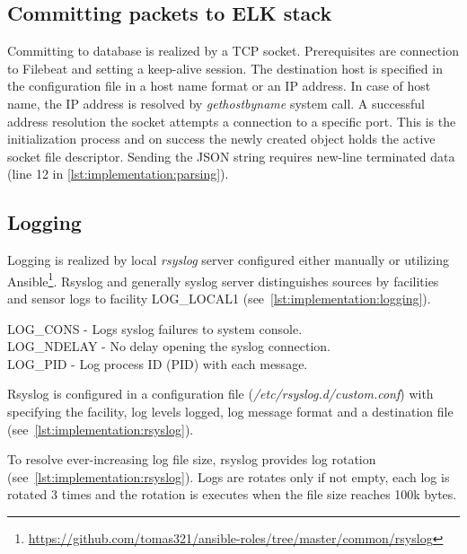 \documentclass[12pt,a4paper,twoside]{report}
\begin{document}
		\subsection{Committing packets to ELK stack} \label{implementation:sensor:commit}
			Committing to database is realized by a TCP socket. Prerequisites are connection to Filebeat and setting a keep-alive session. The destination host is specified in the configuration file in a host name format or an IP address. In case of host name, the IP address is resolved by \emph{gethostbyname} system call. A successful address resolution the socket attempts a connection to a specific port. This is the initialization process and on success the newly created object holds the active socket file descriptor. Sending the JSON string requires new-line terminated data (line 12 in \autoref{lst:implementation:parsing}).	
		\subsection{Logging} \label{implementation:sensor:logging}
			Logging is realized by local \emph{rsyslog} server configured either manually or utilizing Ansible\footnote{\url{https://github.com/tomas321/ansible-roles/tree/master/common/rsyslog}}. Rsyslog and generally syslog server distinguishes sources by facilities \cite{man:syslog} and sensor logs to facility LOG\_LOCAL1 (see~\autoref{lst:implementation:logging}).
			
			LOG\_CONS - Logs syslog failures to system console.\\
			LOG\_NDELAY - No delay opening the syslog connection.\\
			LOG\_PID - Log process ID (PID) with each message.\par
			Rsyslog is configured in a configuration file (\emph{/etc/rsyslog.d/custom.conf}) with specifying the facility, log levels logged, log message format and a destination file (see~\autoref{lst:implementation:rsyslog}).
			\par
			To resolve ever-increasing log file size, rsyslog provides log rotation (see~\autoref{lst:implementation:rsyslog}). Logs are rotates only if not empty, each log is rotated 3 times and the rotation is executes when the file size reaches 100k bytes.
			
\end{document}
